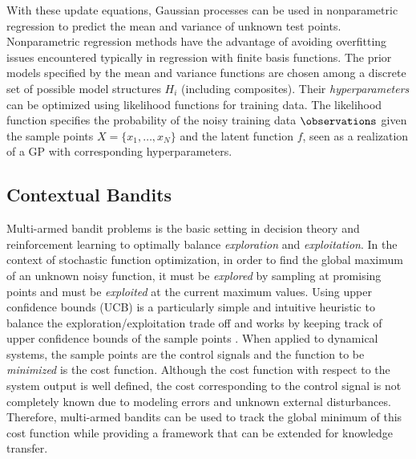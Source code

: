 With these update equations, Gaussian processes can be used in nonparametric regression to predict the mean and variance of unknown test points. Nonparametric regression methods have the advantage of avoiding overfitting issues encountered typically in regression with finite basis functions. The prior models specified by the mean and variance functions are chosen among a discrete set of possible model structures  $\mathit{H_i}$ (including composites). Their \textit{hyperparameters} can be optimized using likelihood functions for training data. The likelihood function specifies the probability of the noisy training data $\observations$ given the sample points $X = \{x_1,\ldots,x_N\}$ and the latent function $f$, seen as a realization of a GP with corresponding hyperparameters. %



\subsection{Contextual Bandits}

Multi-armed bandit problems is the basic setting in decision theory and reinforcement learning to optimally balance \textit{exploration} and \textit{exploitation}. In the context of stochastic function optimization, in order to find the global maximum of an unknown noisy function, it must be \textit{explored} by sampling at promising points and must be \textit{exploited} at the current maximum values. Using upper confidence bounds (UCB) is a particularly simple and intuitive heuristic to balance the exploration/exploitation trade off and works by keeping track of upper confidence bounds of the sample points \cite{Srinivas09}. When applied to dynamical systems, the sample points are the control signals and the function to be \emph{minimized} is the cost function. Although the cost function with respect to the system output is well defined, the cost corresponding to the control signal is not completely known due to modeling errors and unknown external disturbances. Therefore, multi-armed bandits can be used to track the global minimum of this cost function while providing a framework that can be extended for knowledge transfer.


